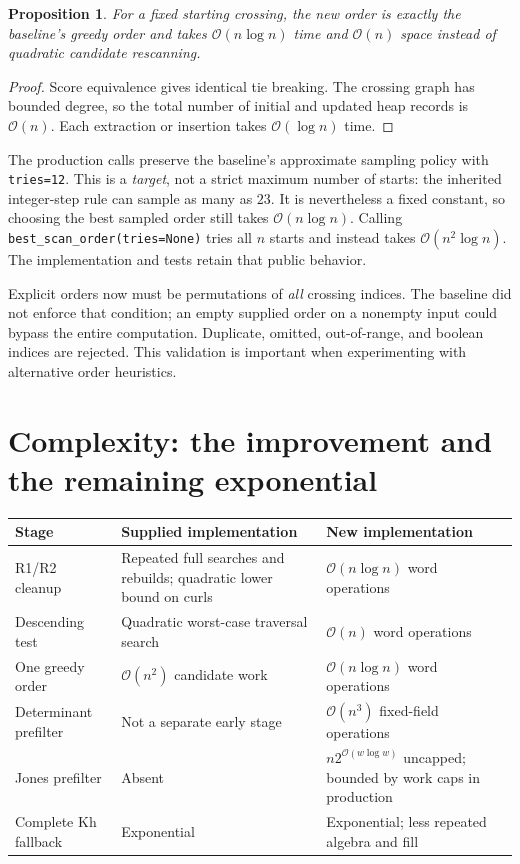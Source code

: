 \documentclass[11pt]{article}
\newtheorem{proposition}[theorem]{Proposition}
\theoremstyle{remark}\newtheorem{remark}[theorem]{Remark}
\newcommand{\OO}{\mathcal O}
\newcommand{\code}[1]{\texttt{\small #1}}
\begin{document}
\begin{proposition}
For a fixed starting crossing, the new order is exactly the baseline's
greedy order and takes $\OO(n\log n)$ time and $\OO(n)$ space instead of
quadratic candidate rescanning.
\end{proposition}
\begin{proof}
Score equivalence gives identical tie breaking. The crossing graph has
bounded degree, so the total number of initial and updated heap records
is $\OO(n)$. Each extraction or insertion takes $\OO(\log n)$ time.
\end{proof}

The production calls preserve the baseline's approximate sampling policy
with \code{tries=12}. This is a \emph{target}, not a strict maximum number
of starts: the inherited integer-step rule can sample as many as $23$.
It is nevertheless a fixed constant, so choosing the best sampled order
still takes $\OO(n\log n)$. Calling \code{best\_scan\_order(tries=None)}
tries all $n$ starts and instead takes $\OO(n^2\log n)$. The implementation
and tests retain that public behavior.

Explicit orders now must be permutations of \emph{all} crossing indices.
The baseline did not enforce that condition; an empty supplied order on a
nonempty input could bypass the entire computation. Duplicate, omitted,
out-of-range, and boolean indices are rejected. This validation is important
when experimenting with alternative order heuristics.

\section{Complexity: the improvement and the remaining exponential}

\begin{center}
\begin{tabularx}{\linewidth}{@{}lXX@{}}
\toprule
Stage & Supplied implementation & New implementation\\
\midrule
R1/R2 cleanup & Repeated full searches and rebuilds; quadratic lower bound on curls
 & $\OO(n\log n)$ word operations\\
Descending test & Quadratic worst-case traversal search & $\OO(n)$ word operations\\
One greedy order & $\OO(n^2)$ candidate work & $\OO(n\log n)$ word operations\\
Determinant prefilter & Not a separate early stage & $\OO(n^3)$ fixed-field operations\\
Jones prefilter & Absent & $n2^{\OO(w\log w)}$ uncapped; bounded by work caps in production\\
Complete Kh fallback & Exponential & Exponential; less repeated algebra and fill\\
\bottomrule
\end{tabularx}
\end{center}
\end{document}
